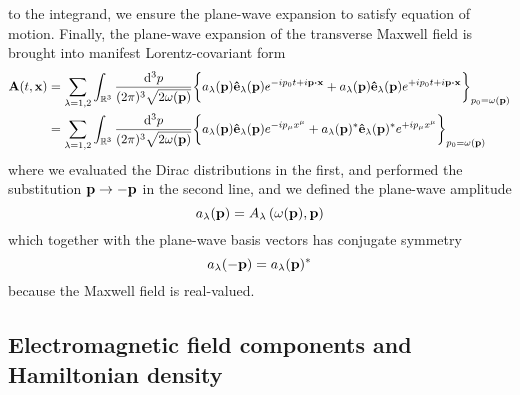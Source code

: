 to the integrand, we ensure the plane-wave expansion to satisfy equation of motion.
Finally, the plane-wave expansion of the transverse Maxwell field is brought into manifest Lorentz-covariant form
\begin{equation}
	\begin{split}
		\vb{A}(t,\vb{x})
		&=
		\sum_{\lambda=1,2}
		\int_{\mathbb{R}^3}\frac{\dd[3]{p}}{(2\pi)^3\sqrt{2\omega(\vb{p})}}
		\biggl\{
			a_\lambda(\vb{p})
			\vu{e}_\lambda(\vb{p})
			e^{-ip_0t+i\vb{p}\vdot\vb{x}}
			+
			a_\lambda(\vb{p})
			\vu{e}_\lambda(\vb{p})
			e^{+ip_0t+i\vb{p}\vdot\vb{x}}
		\biggr\}_{p_0=\omega(\vb{p})}
		\\
		&=
		\sum_{\lambda=1,2}
		\int_{\mathbb{R}^3}\frac{\dd[3]{p}}{(2\pi)^3\sqrt{2\omega(\vb{p})}}
		\biggl\{
			a_\lambda(\vb{p})
			\vu{e}_\lambda(\vb{p})
			e^{-ip_\mu x^\mu}
			+
			a_\lambda(\vb{p})^*
			\vu{e}_\lambda(\vb{p})^*
			e^{+ip_\mu x^\mu}
		\biggr\}_{p_0=\omega(\vb{p})}
	\end{split}
\end{equation}
where we evaluated the Dirac distributions in the first, and performed the substitution $\vb{p}\to-\vb{p}$ in the second line, and we defined the plane-wave amplitude
\begin{equation}
	a_\lambda(\vb{p})
	=
	A_\lambda\left(\omega(\vb{p}),\vb{p}\right)
\end{equation}
which together with the plane-wave basis vectors has conjugate symmetry
\begin{equation}
	a_\lambda(-\vb{p})
	=
	a_\lambda(\vb{p})^*	
\end{equation}
because the Maxwell field is real-valued.

\subsection{Electromagnetic field components and Hamiltonian density}

